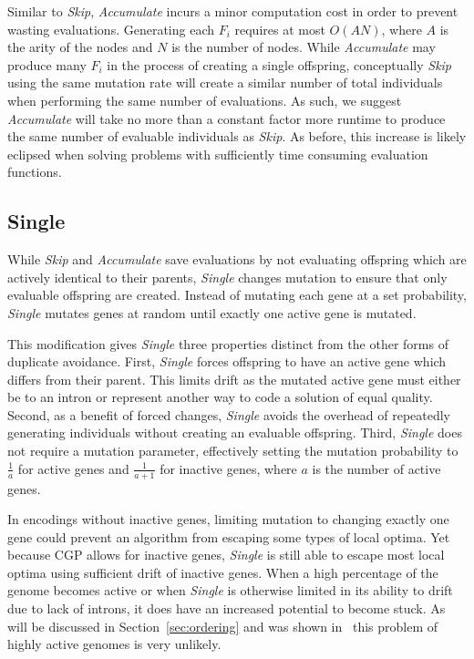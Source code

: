 \documentclass[journal]{IEEEtran}
\begin{document}
Similar to \emph{Skip}, \emph{Accumulate} incurs a minor computation cost in
order to prevent wasting evaluations.  Generating each $F_i$ requires at most
$O(AN)$, where $A$ is the arity of the nodes and $N$ is the number of nodes.
While \emph{Accumulate} may produce many $F_i$ in the process of creating
a single offspring, conceptually \emph{Skip} using the same mutation rate
will create a similar number of total individuals when performing the same
number of evaluations.  As such, we suggest \emph{Accumulate}
will take no more than a constant factor more runtime to produce the same number
of evaluable individuals as \emph{Skip}.  As before, this increase is likely
eclipsed when solving problems with sufficiently time consuming evaluation functions.


\subsection{Single}
While \emph{Skip} and \emph{Accumulate} save evaluations by not evaluating offspring
which are actively identical to their parents, \emph{Single} changes
mutation to ensure that only evaluable offspring are created.  Instead
of mutating each gene at a set probability, \emph{Single} mutates genes at
random until exactly one active gene is mutated.

This modification gives \emph{Single} three properties distinct from the other
forms of duplicate avoidance.  First, \emph{Single} forces offspring to have
an active gene which differs from their parent.  This limits drift as the
mutated active gene must either be to an intron or represent another way to
code a solution of equal quality.  Second, as a benefit of forced changes,
\emph{Single} avoids the overhead of repeatedly generating individuals without
creating an evaluable offspring.  Third, \emph{Single} does not require a mutation
parameter, effectively setting the mutation probability to $\frac{1}{a}$ for active
genes and $\frac{1}{a+1}$ for inactive genes, where $a$ is the number of active genes.

In encodings without inactive genes, limiting mutation to changing exactly one gene
could prevent an algorithm from escaping some types of local optima.  Yet because
CGP allows for inactive genes, \emph{Single} is still able to escape most local
optima using sufficient drift of inactive genes.  When a high percentage of
the genome becomes active or when \emph{Single} is otherwise limited in its ability
to drift due to lack of introns, it does have an increased potential to become stuck.
As will be discussed in Section~\ref{sec:ordering} and was shown in~\cite{goldman:2013:ordering}
this problem of highly active genomes is very unlikely.
\end{document}
